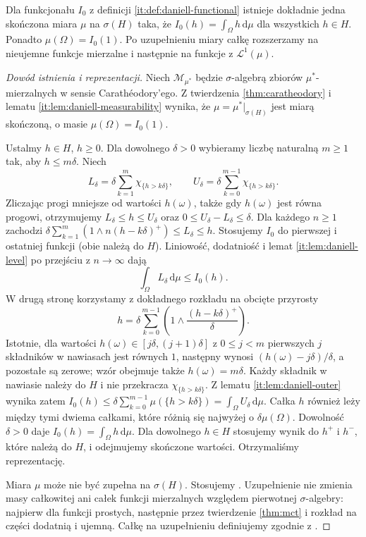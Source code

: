 \begin{twierdzenie}
\label{it:thm:daniell-stone}
Dla funkcjonału $I_0$ z definicji \ref{it:def:daniell-functional} istnieje dokładnie jedna skończona miara $\mu$ na $\sigma(H)$ taka, że $I_0(h)=\int_\Omega h\,\mathrm d\mu$ dla wszystkich $h\in H$. Ponadto $\mu(\Omega)=I_0(1)$. Po uzupełnieniu miary całkę rozszerzamy na nieujemne funkcje mierzalne i następnie na funkcje z $\mathcal L^1(\mu)$.
\end{twierdzenie}
\begin{proof}[Dowód istnienia i reprezentacji]
Niech $\mathcal M_{\mu^*}$ będzie $\sigma$-algebrą zbiorów $\mu^*$-mierzalnych w sensie Carathéodory'ego. Z twierdzenia \ref{thm:caratheodory} i lematu \ref{it:lem:daniell-measurability} wynika, że $\mu=\mu^*|_{\sigma(H)}$ jest miarą skończoną, o masie $\mu(\Omega)=I_0(1)$.

Ustalmy $h\in H$, $h\ge0$. Dla dowolnego $\delta>0$ wybieramy liczbę naturalną $m\ge1$ tak, aby $h\le m\delta$. Niech
\[
 L_\delta=\delta\sum_{k=1}^{m}\chi_{\{h>k\delta\}},\qquad
 U_\delta=\delta\sum_{k=0}^{m-1}\chi_{\{h>k\delta\}}.
\]
Zliczając progi mniejsze od wartości $h(\omega)$, także gdy $h(\omega)$ jest równa progowi, otrzymujemy
$L_\delta\le h\le U_\delta$ oraz
$0\le U_\delta-L_\delta\le\delta$.
Dla każdego $n\ge1$ zachodzi
$\delta\sum_{k=1}^{m}(1\wedge n(h-k\delta)^+)\le L_\delta\le h$.
Stosujemy $I_0$ do pierwszej i ostatniej funkcji (obie należą do $H$). Liniowość, dodatniość i lemat \ref{it:lem:daniell-level} po przejściu z $n\to\infty$ dają
\[
 \int_\Omega L_\delta\,\mathrm d\mu\le I_0(h).
\]
W drugą stronę korzystamy z dokładnego rozkładu na obcięte przyrosty
\[
 h=\delta\sum_{k=0}^{m-1}
 \left(1\wedge\frac{(h-k\delta)^+}{\delta}\right).
\]
Istotnie, dla wartości $h(\omega)\in[j\delta,(j+1)\delta]$ z $0\le j<m$ pierwszych $j$ składników w nawiasach jest równych $1$, następny wynosi $(h(\omega)-j\delta)/\delta$, a pozostałe są zerowe; wzór obejmuje także $h(\omega)=m\delta$. Każdy składnik w nawiasie należy do $H$ i nie przekracza $\chi_{\{h>k\delta\}}$. Z lematu \ref{it:lem:daniell-outer} wynika zatem
$I_0(h)\le\delta\sum_{k=0}^{m-1}\mu(\{h>k\delta\})=\int_\Omega U_\delta\,\mathrm d\mu$.
Całka $h$ również leży między tymi dwiema całkami, które różnią się najwyżej o $\delta\mu(\Omega)$. Dowolność $\delta>0$ daje $I_0(h)=\int_\Omega h\,\mathrm d\mu$. Dla dowolnego $h\in H$ stosujemy wynik do $h^+$ i $h^-$, które należą do $H$, i odejmujemy skończone wartości. Otrzymaliśmy reprezentację.

Miara $\mu$ może nie być zupełna na $\sigma(H)$.
Stosujemy .
Uzupełnienie nie zmienia masy całkowitej ani całek
funkcji mierzalnych względem pierwotnej $\sigma$-algebry:
najpierw dla funkcji prostych, następnie przez
twierdzenie \ref{thm:mct} i rozkład na części
dodatnią i ujemną. Całkę na uzupełnieniu definiujemy
zgodnie z .
\end{proof}
